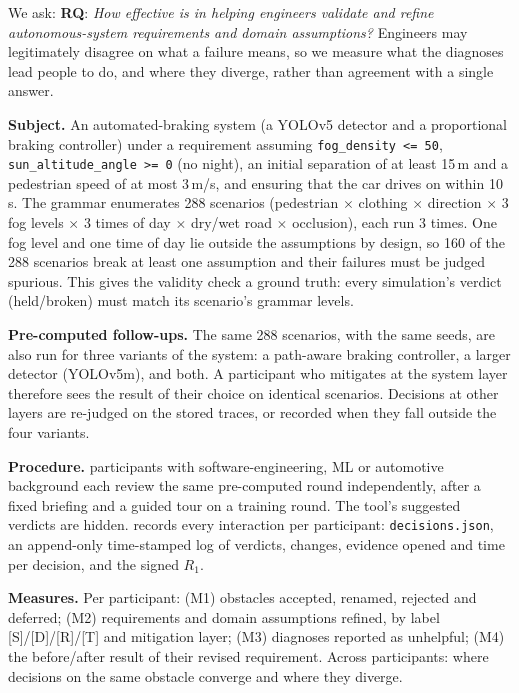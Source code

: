 We ask: \textbf{RQ}: \emph{How effective is \toolname{} in helping engineers
validate and refine autonomous-system requirements and domain assumptions?}
Engineers may legitimately disagree on what a failure means, so we measure
what the diagnoses lead people to do, and where they diverge, rather than
agreement with a single answer.

\textbf{Subject.} An automated-braking system (a YOLOv5 detector and a
proportional braking controller) under a requirement assuming
\texttt{fog\_density <= 50}, \texttt{sun\_altitude\_angle >= 0} (no night),
an initial separation of at least 15\,m and a pedestrian speed of at most
3\,m/s, and ensuring that the car drives on within 10\,s. The grammar
enumerates 288 scenarios (pedestrian $\times$ clothing $\times$ direction
$\times$ 3 fog levels $\times$ 3 times of day $\times$ dry/wet road
$\times$ occlusion), each run 3 times. One fog level and one time of day lie
outside the assumptions by design, so 160 of the 288 scenarios break at
least one assumption and their failures must be judged spurious. This gives
the validity check a ground truth: every simulation's verdict
(held/broken) must match its scenario's grammar levels.

\textbf{Pre-computed follow-ups.} The same 288 scenarios, with the same
seeds, are also run for three variants of the system: a path-aware braking
controller, a larger detector (YOLOv5m), and both. A participant who mitigates
at the system layer therefore sees the result of their choice on identical
scenarios. Decisions at other layers are re-judged on the stored traces, or
recorded when they fall outside the four variants.

\textbf{Procedure.}  participants with software-engineering, ML or
automotive background each review the same pre-computed round independently,
after a fixed briefing and a guided tour on a training round. The tool's
suggested verdicts are hidden. \toolname{} records every interaction per
participant: \texttt{decisions.json}, an append-only time-stamped log of
verdicts, changes, evidence opened and time per decision, and the signed
$R_1$.

\textbf{Measures.} Per participant: (M1) obstacles accepted, renamed,
rejected and deferred; (M2) requirements and domain assumptions refined, by
label [S]/[D]/[R]/[T] and mitigation layer; (M3) diagnoses reported as
unhelpful; (M4) the before/after result of their revised requirement.
Across participants: where decisions on the same obstacle converge and where
they diverge.

